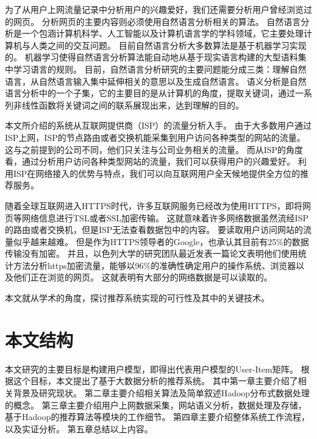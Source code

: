 为了从用户上网流量记录中分析用户的兴趣爱好，我们还需要分析用户曾经浏览过的网页。
分析网页的主要内容则必须使用自然语言分析相关的算法。
自然语言分析是一个包涵计算机科学、人工智能以及计算机语言学的学科领域，它主要处理计算机与人类之间的交互问题。
目前自然语言分析大多数算法是基于机器学习实现的。
机器学习使得自然语言分析算法能自动地从基于现实语言构建的大型语料集中学习语言的规则。
目前，自然语言分析研究的主要问题能分成三类：理解自然语言，从自然语言输入集中延伸相关的意思以及生成自然语言。
语义分析是自然语言分析中的一个子集，它的主要目的是从计算机的角度，提取关键词，通过一系列非线性函数将关键词之间的联系展现出来，达到理解的目的。

本文所介绍的系统从互联网提供商（ISP）的流量分析入手。
由于大多数用户通过ISP上网，ISP的节点路由或者交换机能采集到用户访问各种类型的网站的流量。
这与之前提到的公司不同，他们只关注与公司业务相关的流量。
而从ISP的角度看，通过分析用户访问各种类型网站的流量，我们可以获得用户的兴趣爱好。
利用ISP在网络接入的优势与特点，我们可以向互联网用户全天候地提供全方位的推荐服务。

随着全球互联网进入HTTPS时代，许多互联网服务已经改为使用HTTPS，即将网页等网络信息进行TSL或者SSL加密传输。
这就意味着许多网络数据虽然流经ISP的路由或者交换机，但是ISP无法查看数据包中的内容。
要读取用户访问网站的流量似乎越来越难。
但是作为HTTPS领导者的Google，也承认其目前有25\%的数据传输没有加密。
并且，以色列大学的研究团队最近发表一篇论文表明他们使用统计方法分析https加密流量，能够以96\%的准确性确定用户的操作系统、浏览器以及他们正在浏览的网页。
这就表明有大部分的网络数据是可以读取的。

本文就从学术的角度，探讨推荐系统实现的可行性及其中的关键技术。

\section{本文结构}
本文研究的主要目标是构建用户模型，即得出代表用户模型的User-Item矩阵。
根据这个目标，本文提出了基于大数据分析的推荐系统。
其中第一章主要介绍了相关背景及研究现状。
第二章主要介绍相关算法及简单叙述Hadoop分布式数据处理的概念。
第三章主要介绍用户上网数据采集，网站语义分析，数据处理及存储，基于Hadoop的推荐算法等模块的工作细节。
第四章主要介绍整体系统工作流程，以及实证分析。
第五章总结以上内容。
